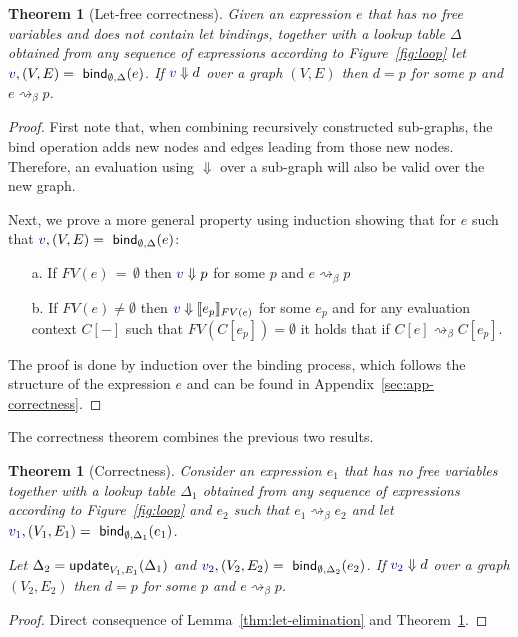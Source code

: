\documentclass[sigplan,10pt,review,anonymous]{acmart}\settopmatter{printfolios=true,printccs=false,printacmref=false}
\newcounter{thc}
\theoremstyle{plain}
\newtheorem{theorem}[thc]{Theorem}
\theoremstyle{definition}
\newcommand{\ident}[1]{\textnormal{\sffamily #1}}
\newcommand{\bndclr}[1]{\textcolor{kvdclr}{#1}}
\begin{document}
\begin{theorem}[Let-free correctness]
\label{thm:let-free-correct}
Given an expression $e$ that has no free variables and does not contain let bindings, together
with a lookup table $\Delta$ obtained from any sequence of expressions according to Figure~\ref{fig:loop}
let $\bndclr{v}, (V, E) = \ident{bind}_{\emptyset, \Delta}(e)$. If $\bndclr{v}\Downarrow d$ 
over a graph $(V, E)$ then $d = p$ for some $p$ and $e \rightsquigarrow_\beta p$.
\end{theorem}
\begin{proof}
First note that, when combining recursively constructed sub-graphs, the \ident{bind} operation
adds new nodes and edges leading from those new nodes. Therefore, an evaluation using $\Downarrow$
over a sub-graph will also be valid over the new graph.

Next, we prove a more general property using induction showing that for $e$ such 
that $\bndclr{v}, (V, E) = \ident{bind}_{\emptyset, \Delta}(e)$:
\begin{enumerate}
\item[a.] If $FV(e)\,=\,\emptyset$ then $\bndclr{v} \Downarrow p$ for some $p$ and $e \rightsquigarrow_\beta p$
\item[b.] If $FV(e)\neq\emptyset$ then $\bndclr{v} \Downarrow \llbracket e_p \rrbracket_{FV(e)}$ for some $e_p$ and
  for any evaluation context $C[-]$ such that $FV(C[e_p])=\emptyset$ it holds that if
  $C[e] \rightsquigarrow_\beta C[e_p]$.  
\end{enumerate}
%
The proof is done by induction over the binding process, which follows the structure 
of the expression $e$ and can be found in Appendix~\ref{sec:app-correctness}.
\end{proof}

\noindent
The correctness theorem combines the previous two results.

\begin{theorem}[Correctness]
\label{thm:correcntess}
Consider an expression $e_1$ that has no free variables together with a lookup table $\Delta_1$ obtained 
from any sequence of expressions according to Figure~\ref{fig:loop} and $e_2$ such that
$e_1\rightsquigarrow_\beta e_2$ and let $\bndclr{v_1}, (V_1, E_1) = \ident{bind}_{\emptyset, \Delta_1}(e_1)$.

Let $\Delta_2 = \ident{update}_{V_1, E_1}(\Delta_1)$ and $\bndclr{v_2}, (V_2, E_2) = \ident{bind}_{\emptyset, \Delta_2}(e_2)$.
If $\bndclr{v_2}\Downarrow d$ over a graph $(V_2, E_2)$ then $d = p$ for some $p$ and $e \rightsquigarrow_\beta p$.
\end{theorem}
\begin{proof}
Direct consequence of Lemma~\ref{thm:let-elimination} and Theorem~\ref{thm:let-free-correct}.
\end{proof}
\end{document}
